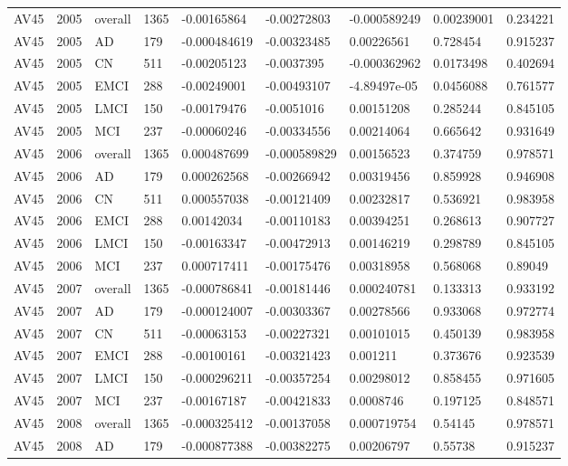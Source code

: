 \begin{landscape}
\begin{longtable}{lllllllll}
AV45 & 2005 & overall & 1365 & -0.00165864 & -0.00272803 & -0.000589249 & 0.00239001 & 0.234221 \\
AV45 & 2005 & AD & 179 & -0.000484619 & -0.00323485 & 0.00226561 & 0.728454 & 0.915237 \\
AV45 & 2005 & CN & 511 & -0.00205123 & -0.0037395 & -0.000362962 & 0.0173498 & 0.402694 \\
AV45 & 2005 & EMCI & 288 & -0.00249001 & -0.00493107 & -4.89497e-05 & 0.0456088 & 0.761577 \\
AV45 & 2005 & LMCI & 150 & -0.00179476 & -0.0051016 & 0.00151208 & 0.285244 & 0.845105 \\
AV45 & 2005 & MCI & 237 & -0.00060246 & -0.00334556 & 0.00214064 & 0.665642 & 0.931649 \\
AV45 & 2006 & overall & 1365 & 0.000487699 & -0.000589829 & 0.00156523 & 0.374759 & 0.978571 \\
AV45 & 2006 & AD & 179 & 0.000262568 & -0.00266942 & 0.00319456 & 0.859928 & 0.946908 \\
AV45 & 2006 & CN & 511 & 0.000557038 & -0.00121409 & 0.00232817 & 0.536921 & 0.983958 \\
AV45 & 2006 & EMCI & 288 & 0.00142034 & -0.00110183 & 0.00394251 & 0.268613 & 0.907727 \\
AV45 & 2006 & LMCI & 150 & -0.00163347 & -0.00472913 & 0.00146219 & 0.298789 & 0.845105 \\
AV45 & 2006 & MCI & 237 & 0.000717411 & -0.00175476 & 0.00318958 & 0.568068 & 0.89049 \\
AV45 & 2007 & overall & 1365 & -0.000786841 & -0.00181446 & 0.000240781 & 0.133313 & 0.933192 \\
AV45 & 2007 & AD & 179 & -0.000124007 & -0.00303367 & 0.00278566 & 0.933068 & 0.972774 \\
AV45 & 2007 & CN & 511 & -0.00063153 & -0.00227321 & 0.00101015 & 0.450139 & 0.983958 \\
AV45 & 2007 & EMCI & 288 & -0.00100161 & -0.00321423 & 0.001211 & 0.373676 & 0.923539 \\
AV45 & 2007 & LMCI & 150 & -0.000296211 & -0.00357254 & 0.00298012 & 0.858455 & 0.971605 \\
AV45 & 2007 & MCI & 237 & -0.00167187 & -0.00421833 & 0.0008746 & 0.197125 & 0.848571 \\
AV45 & 2008 & overall & 1365 & -0.000325412 & -0.00137058 & 0.000719754 & 0.54145 & 0.978571 \\
AV45 & 2008 & AD & 179 & -0.000877388 & -0.00382275 & 0.00206797 & 0.55738 & 0.915237 \\

\end{longtable}
\end{landscape}
